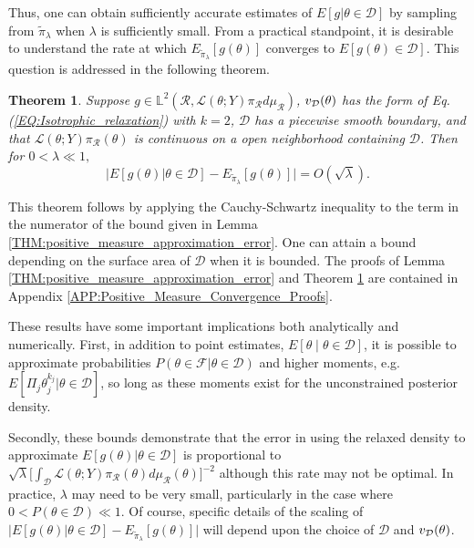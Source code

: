 \documentclass[10pt,fleqn]{article} \pdfoutput=1
\newtheorem{theorem}{Theorem} \newtheorem{lemma}{Lemma}
\DeclareMathOperator{\1}{\mathbbm{1}} \DeclareMathOperator{\bigO}{\mc O}
\begin{document}
Thus, one can obtain sufficiently accurate estimates of
$E[g|\theta\in\mathcal{D}]$ by sampling from $\tilde{\pi}_\lambda$ when
$\lambda$ is sufficiently small.  From a practical standpoint, it is
desirable to understand the rate at which
$E_{\tilde{\pi}_\lambda}[g(\theta)] $ converges to
$E[g(\theta)\in\mathcal{D}]$. This question is addressed in the following
theorem.

\begin{theorem} \label{THM:Positive_measure_convergence_rate} Suppose $g
		\in  \mathbb{L}^2(\mathcal{R},
		\mathcal{L}(\theta;Y)\pi_\mathcal{R}d\mu_\mathcal{R})$,
	$v_{\mathcal{D}}(\theta)$ has the form of Eq. (\ref{EQ:Isotrophic_relaxation})
	with $k=2$, $\mathcal{D}$ has a piecewise smooth boundary, and that
	$\mathcal{L}(\theta;Y)\pi_\mathcal{R}(\theta)$ is continuous on a
	open neighborhood containing $\mathcal{D}$.  Then for $0<\lambda
		\ll 1,$ $$ \bigg|E[g(\theta) |\theta\in\mathcal{D}] -
		E_{\tilde{\pi}_\lambda}[g(\theta)]   \bigg| = O(\sqrt{\lambda}).  $$
\end{theorem} This theorem follows by applying the Cauchy-Schwartz
inequality to the term in the numerator of the bound given in Lemma
\ref{THM:positive_measure_approximation_error}.  One can attain a bound
depending on the surface area of $\mathcal{D}$ when it is bounded. The proofs of
Lemma \ref{THM:positive_measure_approximation_error} and Theorem
\ref{THM:Positive_measure_convergence_rate} are contained in Appendix
\ref{APP:Positive_Measure_Convergence_Proofs}.

These results have some important implications both analytically and
numerically.  First, in addition to point estimates,
$E[\theta \mid \theta\in\mathcal{D}]$, it is possible to approximate
probabilities $P(\theta \in \mathcal{F}|\theta \in \mathcal{D})$ and higher
moments, e.g. $E[\Pi_j \theta_j^{k_j} |\theta\in\mathcal{D}]$, so long as
these moments exist for the unconstrained posterior density.

Secondly, these bounds demonstrate that the error in using the relaxed
density to approximate $E[g(\theta)|\theta\in\mathcal{D}]$ is proportional
to $\sqrt{\lambda} [\int_\mathcal{D}\mathcal{L}(\theta; Y)
		\pi_\mathcal{R}(\theta)d\mu_\mathcal{R}(\theta)\big]^{-2}$ although this
rate may not be optimal.  In practice, $\lambda$ may need to be very small,
particularly in the case where $0<P(\theta\in\mathcal{D})\ll 1.$ Of course,
specific details of the scaling of $\bigg|E[g(\theta)
	|\theta\in\mathcal{D}] - E_{\tilde{\pi}_\lambda}[g(\theta)]   \bigg|$ will
depend upon the choice of $\mathcal{D}$ and $v_{\mathcal{D}}(\theta)$.
\end{document}
